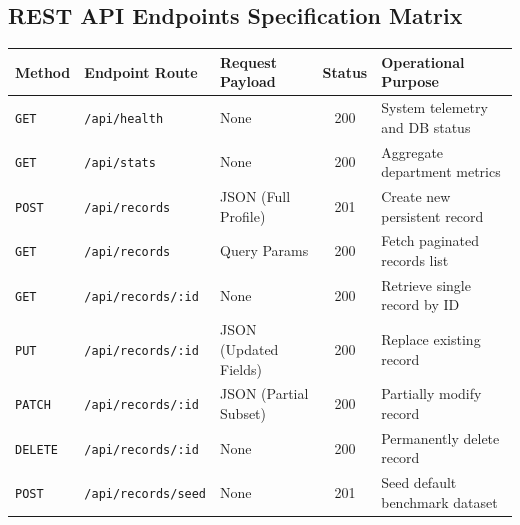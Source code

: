 \documentclass[11pt,a4paper]{article}
\begin{document}
\subsection{REST API Endpoints Specification Matrix}
\begin{center}
\renewcommand{\arraystretch}{1.25}
\begin{tabularx}{\textwidth}{|l|l|p{3.2cm}|c|X|}
\hline
\textbf{Method} & \textbf{Endpoint Route} & \textbf{Request Payload} & \textbf{Status} & \textbf{Operational Purpose} \\ \hline
\texttt{GET} & \texttt{/api/health} & None & 200 & System telemetry and DB status \\ \hline
\texttt{GET} & \texttt{/api/stats} & None & 200 & Aggregate department metrics \\ \hline
\texttt{POST} & \texttt{/api/records} & JSON (Full Profile) & 201 & Create new persistent record \\ \hline
\texttt{GET} & \texttt{/api/records} & Query Params & 200 & Fetch paginated records list \\ \hline
\texttt{GET} & \texttt{/api/records/:id} & None & 200 & Retrieve single record by ID \\ \hline
\texttt{PUT} & \texttt{/api/records/:id} & JSON (Updated Fields) & 200 & Replace existing record \\ \hline
\texttt{PATCH} & \texttt{/api/records/:id} & JSON (Partial Subset) & 200 & Partially modify record \\ \hline
\texttt{DELETE} & \texttt{/api/records/:id} & None & 200 & Permanently delete record \\ \hline
\texttt{POST} & \texttt{/api/records/seed} & None & 201 & Seed default benchmark dataset \\ \hline
\end{tabularx}
\end{center}
\end{document}

